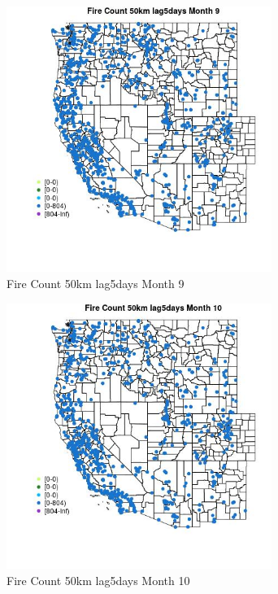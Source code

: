 \begin{figure} 
\centering  
\includegraphics[width=0.77\textwidth]{Code_Outputs/Report_ML_input_PM25_Step4_part_f_de_duplicated_aveswNAs_MapObsMo9Fire_Count_50km_lag5days.jpg} 
\caption{\label{fig:Report_ML_input_PM25_Step4_part_f_de_duplicated_aveswNAsMapObsMo9Fire_Count_50km_lag5days}Fire Count 50km lag5days Month 9} 
\end{figure} 
 

\begin{figure} 
\centering  
\includegraphics[width=0.77\textwidth]{Code_Outputs/Report_ML_input_PM25_Step4_part_f_de_duplicated_aveswNAs_MapObsMo10Fire_Count_50km_lag5days.jpg} 
\caption{\label{fig:Report_ML_input_PM25_Step4_part_f_de_duplicated_aveswNAsMapObsMo10Fire_Count_50km_lag5days}Fire Count 50km lag5days Month 10} 
\end{figure} 
 

